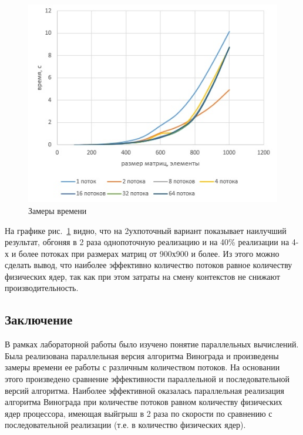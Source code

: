 \documentclass[a4paper,12pt]{article}
\begin{document}
	\begin{center}
					\begin{figure}[H]	
        				{
        					\centering
        					\includegraphics[scale=0.7]{time.jpg}
        					\caption{\label{ris:test1}Замеры времени}
        				}
        			\end{figure}
	\end{center}

	На графике рис.~\ref{ris:test1} видно, что на 2ухпоточный вариант показывает наилучший результат, обгоняя в 2 раза однопоточную реализацию и на 40\% реализации на 4-х и более потоках при размерах матриц от 900х900 и более. Из этого можно сделать вывод, что наиболее эффективно количество потоков равное количеству физических ядер, так как при этом затраты на смену контекстов не снижают производительность.

    \newpage

    \begin{center}
        \section*{Заключение}
    \end{center}
            \label{sec:ending}
        	\qquad В рамках лабораторной работы было изучено понятие параллельных вычислений. Была реализована параллельная версия алгоритма Винограда и произведены замеры времени ее работы с различным количеством потоков. На основании этого произведено сравнение эффективности параллельной и последовательной версий алгоритма. Наиболее эффективной оказалась параллельная реализация алгоритма Винограда при количестве потоков равном количеству физических ядер процессора, имеющая выйгрыш в 2 раза по скорости по сравнению с последовательной реализации (т.е. в количество физических ядер).
    \newpage
\end{document}
